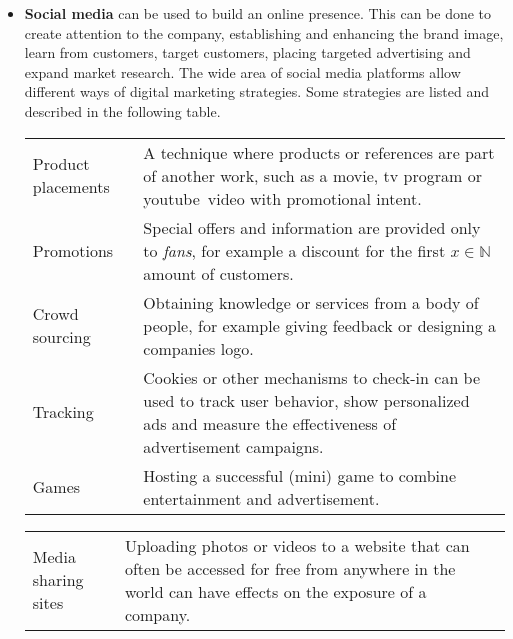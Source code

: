 \documentclass[a4]{scrartcl}
\begin{document}
	\begin{itemize}
		
		
		\item \textbf{Social media} can be used to build an online presence. This can be done to create attention to the company, establishing and enhancing the brand image, learn from customers, target customers, placing targeted advertising and expand market research. The wide area of social media platforms allow different ways of digital marketing strategies. Some strategies are listed and described in the following table.~\cite{socialmedia}
		
		\def\arraystretch{1.35}
		\begin{tabular}{l|p{10.5cm}}
			
			Product placements & A technique where products or references are part of another work, such as a movie, tv program or youtube\footnotemark \ video with promotional intent.~\cite{productplacements} \\
			
			Promotions & Special offers and information are provided only to \textit{fans}, for example a discount for the first $x \in \mathbb{N}$ amount of customers.~\cite{socialmedia} \\
			
			Crowd sourcing & Obtaining knowledge or services from a body of people, for example giving feedback or designing a companies logo.~\cite{socialmedia, crowdsourcing} \\ 
			
			Tracking & Cookies or other mechanisms to check-in can be used to track user behavior, show personalized ads and measure the effectiveness of advertisement campaigns.~\cite{cookies} \\
			
			Games & Hosting a successful (mini) game to combine entertainment and advertisement.~\cite{socialmedia}  \\

			
		\end{tabular}	
	
			
		\begin{tabular}{l|p{10.5cm}}
			
			Media sharing sites & Uploading photos or videos to a website that can often be
			accessed for free from anywhere in the world can have effects on the exposure of a company.~\cite{socialmedia} \\
			

\end{tabular}
\end{itemize}
\end{document}

